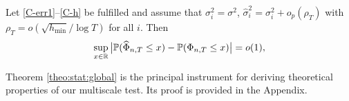 \documentclass[a4paper,12pt]{article}
\makeatletter
\renewcommand{\eqref}[1]{\tagform@{\ref{#1}}}
\newcommand{\doublehattwo}[1]{\widehat{\widehat{#1}}}
\makeatother
\begin{document}

\begin{theorem}\label{theo:stat:global}
Let \ref{C-err1}--\ref{C-h} be fulfilled and assume that $\sigma_i^2 = \sigma^2$, $\widehat{\sigma}_i^2 = \sigma^2_i + o_p(\rho_T)$ with $\rho_T = o(\sqrt{h_{\min}}/\log T)$ for all $i$. Then  
\begin{equation*}
\sup_{x \in \mathbb{R}} \big| \mathbb{P}(\widehat{\Phi}_{n, T} \le x) - \mathbb{P}(\Phi_{n,T} \le x) \big| = o(1),
\end{equation*}
\end{theorem}
Theorem \ref{theo:stat:global} is the principal instrument for deriving theoretical properties of our multiscale test. Its proof is provided in the Appendix. 




 
\end{document}
